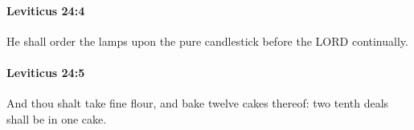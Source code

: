 		\paragraph{Leviticus 24:4} %
			\label{LEVITICUS-24-4}

			He shall order the lamps upon the pure candlestick before the LORD continually.


		\paragraph{Leviticus 24:5} %
			\label{LEVITICUS-24-5}

			And thou shalt take fine flour, and bake twelve cakes thereof: two tenth deals shall be in one cake.


